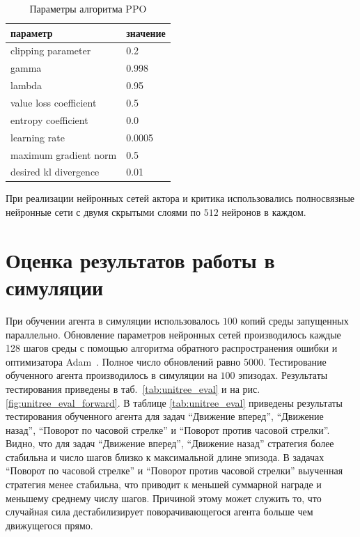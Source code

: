 \begin{table} [htbp]
    \centering
    \begin{threeparttable}
        \caption{Параметры алгоритма PPO}\label{tab:ppoparams}
        \begin{tabular}{| p{8cm} || p{8cm} |}
            \hline
            \hline
            параметр & значение \\
            \hline
            clipping parameter &	0.2 \\
            gamma &	0.998 \\
            lambda &	0.95 \\
            value loss coefficient &	0.5 \\
            entropy coefficient &	0.0 \\
            learning rate &	0.0005 \\
            maximum gradient norm &	0.5 \\
            desired kl divergence &	0.01 \\
            \hline
            \hline
        \end{tabular}
    \end{threeparttable}
\end{table}

При реализации нейронных сетей актора и критика использовались полносвязные нейронные сети с двумя скрытыми слоями по $512$ нейронов в каждом. 

\section{Оценка результатов работы в симуляции}

При обучении агента в симуляции использовалось $100$ копий среды запущенных параллельно. Обновление параметров нейронных сетей производилось каждые 128 шагов среды с помощью алгоритма обратного распространения ошибки и оптимизатора Adam~\cite{kingma2014adam}. Полное число обновлений равно $5000$. Тестирование обученного агента производилось в симуляции на $100$ эпизодах. Результаты тестирования приведены в таб.~\ref{tab:unitree_eval} и на рис.~ \ref{fig:unitree_eval_forward}. В таблице \ref{tab:unitree_eval} приведены результаты тестирования обученного агента для задач ``Движение вперед'', ``Движение назад'', ``Поворот по часовой стрелке'' и ``Поворот против часовой стрелки''. Видно, что для задач ``Движение вперед'', ``Движение назад'' стратегия более стабильна и число шагов близко к максимальной длине эпизода. В задачах ``Поворот по часовой стрелке'' и ``Поворот против часовой стрелки'' выученная стратегия менее стабильна, что приводит к меньшей суммарной награде и меньшему среднему числу шагов. Причиной этому может служить то, что случайная сила дестабилизирует поворачивающегося агента больше чем движущегося прямо.


